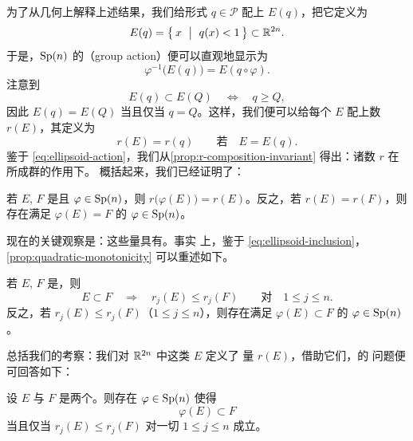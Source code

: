 为了从几何上解释上述结果，我们给形式 $q\in\mathcal{P}$ 配上\trEllipsoid{}%
$E(q)$，把它定义为\trOpenSet
\begin{equation}\label{eq:ellipsoid-definition}
E(q)=\bigl\{\,x\ \bigm|\ q(x)<1\,\bigr\}\subset\mathbb{R}^{2n}.
\end{equation}
于是，$\operatorname{Sp}(n)$ 的\textbf{\trGroupAction}（group action）便可以直观地显示为
\begin{equation}\label{eq:ellipsoid-action}
\varphi^{-1}\bigl(E(q)\bigr)=E(q\circ\varphi).
\end{equation}
注意到
\begin{equation}\label{eq:ellipsoid-inclusion}
E(q)\subset E(Q)\quad\Longleftrightarrow\quad q\geq Q,
\end{equation}
因此 $E(q)=E(Q)$ 当且仅当 $q=Q$。这样，我们便可以给每个\trOpenSet{} $E$%
配上数 $r(E)$，其定义为
\begin{equation}\label{eq:r-of-ellipsoid}
r(E)=r(q)\qquad\text{若}\quad E=E(q).
\end{equation}
鉴于 \eqref{eq:ellipsoid-action}，我们从\cref{prop:r-composition-invariant}%
得出：诸数 $r$ 在\trLinear\trSymplectic\trMapping{}所成群的作用下\trInvariant。%
概括起来，我们已经证明了：

\begin{proposition}\label{prop:ellipsoid-invariants}
若 $E$, $F$ 是\trEllipsoid{}且 $\varphi\in\operatorname{Sp}(n)$，则%
$r\bigl(\varphi(E)\bigr)=r(E)$。反之，若 $r(E)=r(F)$，则存在满足%
$\varphi(E)=F$ 的\trMapping{} $\varphi\in\operatorname{Sp}(n)$。
\end{proposition}

现在的关键观察是：这些\trInvariant{}量具有\trMonotonicity。事实%
上，鉴于 \eqref{eq:ellipsoid-inclusion}，\cref{prop:quadratic-monotonicity}%
可以重述如下。

\begin{proposition}\label{prop:ellipsoid-monotonicity}
若 $E$, $F$ 是\trEllipsoid，则
\[
E\subset F\quad\Longrightarrow\quad r_j(E)\leq r_j(F)
\qquad\text{对}\quad 1\leq j\leq n.
\]
反之，若 $r_j(E)\leq r_j(F)$（$1\leq j\leq n$），则存在满足%
$\varphi(E)\subset F$ 的 $\varphi\in\operatorname{Sp}(n)$。
\end{proposition}

总括我们的考察：我们对 $\mathbb{R}^{2n}$ 中\trEllipsoid{}这类\trOpenSet{} $E$ 定义了%
\trInvariant{}量 $r(E)$，借助它们，\trEllipsoid{}的\trLinear%
\trSymplecticEmbedding{}问题便可回答如下：

\begin{theorem}\label{thm:ellipsoid-linear-embedding}
设 $E$ 与 $F$ 是两个\trEllipsoid。则存在 $\varphi\in\operatorname{Sp}(n)$ 使得
\[
\varphi(E)\subset F
\]
当且仅当 $r_j(E)\leq r_j(F)$ 对一切 $1\leq j\leq n$ 成立。
\end{theorem}


